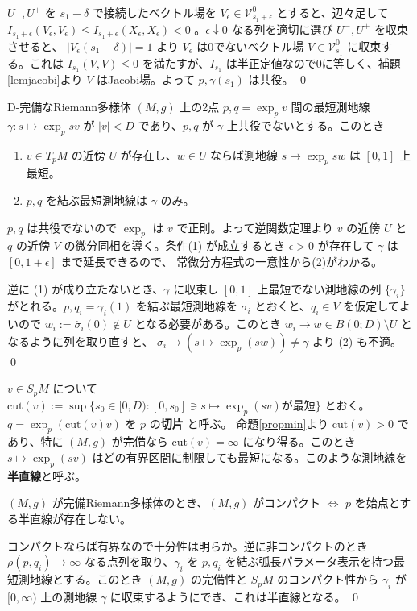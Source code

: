 \documentclass[dvipdfmx,a4paper]{jsreport}
\theoremstyle{definition}
\renewcommand{\bar}{\overline}
\begin{document}
$U^-,U^+$ を $s_1-\delta$ で接続したベクトル場を $V_\epsilon \in \mathcal{V}^0_{s_1+\epsilon}$ とすると、辺々足して $I_{s_1+\epsilon}(V_\epsilon,V_\epsilon) \leq I_{s_1+\epsilon}(X_\epsilon,X_\epsilon)<0$ 。$\epsilon \downarrow 0$ なる列を適切に選び $U^-,U^+$ を収束させると、 $|V_\epsilon(s_1-\delta)|=1$ より $V_\epsilon$ は0でないベクトル場 $V \in \mathcal{V}^0_{s_1}$ に収束する。これは $I_{s_1}(V,V) \leq 0$ を満たすが、$I_{s_1}$ は半正定値なので0に等しく、補題\ref{lemjacobi}より $V$ はJacobi場。よって $p,\gamma(s_1)$ は共役。
\qed

\lem\label{lemnbhd} D-完備なRiemann多様体 $(M,g)$ 上の2点 $p,q=\exp_p v$ 間の最短測地線 $\gamma:s \mapsto \exp_p sv$ が  $|v|<D$ であり、$p,q$ が $\gamma$ 上共役でないとする。このとき
\begin{enumerate}
    \item $v \in T_pM$ の近傍 $U$ が存在し、$w \in U$ ならば測地線 $s \mapsto \exp_p sw$ は $[0,1]$ 上最短。
    \item $p,q$ を結ぶ最短測地線は $\gamma$ のみ。
\end{enumerate}

\prf $p,q$ は共役でないので $\exp_p$ は $v$ で正則。よって逆関数定理より $v$ の近傍 $U$ と $q$ の近傍 $V$ の微分同相を導く。条件(1) が成立するとき $\epsilon>0$ が存在して $\gamma$ は $[0,1+\epsilon]$ まで延長できるので、
常微分方程式の一意性から(2)がわかる。

逆に (1) が成り立たないとき、$\gamma$ に収束し $[0,1]$ 上最短でない測地線の列 $\{\gamma_i\}$ がとれる。$p,q_i=\gamma_i(1)$ を結ぶ最短測地線を $\sigma_i$ とおくと、$q_i \in V$ を仮定してよいので $w_i:=\dot{\sigma_i}(0) \notin U$ となる必要がある。このとき $w_i \to w \in \bar{B(0;D)} \setminus U$ となるように列を取り直すと、 $\sigma_i \to (s \mapsto \exp_p(sw)) \neq \gamma$ より (2) も不適。 \qed

 $v \in S_pM$ について $\mbox{cut}(v):=\sup\{s_0 \in [0,D) \colon [0,s_0] \ni s \mapsto \exp_p(sv)\mbox{が最短}\}$  とおく。$q=\exp_p(\mbox{cut}(v)v)$ を $p$ の\textbf{切片} と呼ぶ。 命題\ref{propmin}より $\mbox{cut}(v)>0$ であり、特に $(M,g)$ が完備なら $\mbox{cut}(v)=\infty$ になり得る。このとき $s \mapsto \exp_p(sv)$ はどの有界区間に制限しても最短になる。このような測地線を\textbf{半直線}と呼ぶ。

\lem $(M,g)$ が完備Riemann多様体のとき、$(M,g)$ がコンパクト $\iff$ $p$ を始点とする半直線が存在しない。

\prf コンパクトならば有界なので十分性は明らか。逆に非コンパクトのとき $\rho(p,q_i) \to \infty$ なる点列を取り、$\gamma_i$ を $p,q_i$ を結ぶ弧長パラメータ表示を持つ最短測地線とする。このとき $(M,g)$ の完備性と $S_pM$ のコンパクト性から $\gamma_i$ が $[0,\infty)$ 上の測地線 $\gamma$ に収束するようにでき、これは半直線となる。 \qed
\end{document}
